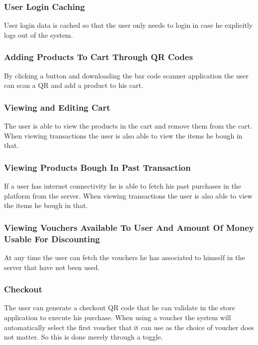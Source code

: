 \documentclass[12pt]{article}
\begin{document}
\subsubsection{User Login Caching}
\hspace{0.6cm}
User login data is cached so that the user only needs to login in case he explicitly logs out of the system.

\subsubsection{Adding Products To Cart Through QR Codes}
\hspace{0.6cm}
By clicking a button and downloading the bar code scanner application the user can scan a QR and add a product to his cart.

\subsubsection{Viewing and Editing Cart}
\hspace{0.6cm}
The user is able to view the products in the cart and remove them from the cart. When viewing transactions the user is also able to view
the items he bough in that.

\subsubsection{Viewing Products Bough In Past Transaction}
\hspace{0.6cm}
If a user has internet connectivity he is able to fetch his past purchases in the platform from the server. When viewing transactions
the user is also able to view the items he bough in that.

\subsubsection{Viewing Vouchers Available To User And Amount Of Money Usable For Discounting}
\hspace{0.6cm}
At any time the user can fetch the vouchers he has associated to himself in the server that have not been used.

\subsubsection{Checkout}
\hspace{0.6cm}
The user can generate a checkout QR code that he can validate in the store application to execute his purchase. When using a voucher the system will automatically select the first
voucher that it can use as the choice of voucher does not matter. So this is done merely through a toggle.
\end{document}

